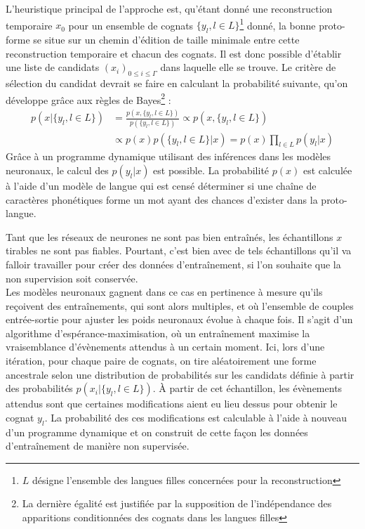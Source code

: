 \documentclass[12pt, french, twoside]{report}
\begin{document}
L'heuristique principal de l'approche est, qu'étant donné une reconstruction temporaire $x_0$ pour un ensemble de cognats $\{y_l, l\in L \}$\footnote{$L$ désigne l'ensemble des langues filles concernées pour la reconstruction} donné, la bonne proto-forme se situe sur un chemin d'édition de taille minimale entre cette reconstruction temporaire et chacun des cognats. Il est donc possible d'établir une liste de candidats $(x_i)_{0\leq{}i\leq{}\Gamma}$ dans laquelle elle se trouve. Le critère de sélection du candidat devrait se faire en calculant la probabilité suivante, qu'on développe grâce aux règles de Bayes\footnote{La dernière égalité est justifiée par la supposition de l'indépendance des apparitions conditionnées des cognats dans les langues filles} :
\begin{equation} \label{probaSampling}
    \begin{split}
        p(x|\{y_l, l \in L\}) & = \frac{p(x, \{y_l, l \in L\})}{p(\{y_l, l \in L\})} \propto p(x, \{y_l, l \in L\})\\
        & \propto p(x)p(\{y_l, l \in L\}|x) = p(x)\prod_{l\in L} p(y_l|x)
    \end{split}
\end{equation}
Grâce à un programme dynamique utilisant des inférences dans les modèles neuronaux, le calcul des $p(y_l|x)$ est possible. La probabilité $p(x)$ est calculée à l'aide d'un modèle de langue qui est censé déterminer si une chaîne de caractères phonétiques forme un mot ayant des chances d'exister dans la proto-langue.\citep[Section 5]{he2022neural}

Tant que les réseaux de neurones ne sont pas bien entraînés, les échantillons $x$ tirables ne sont pas fiables. Pourtant, c'est bien avec de tels échantillons qu'il va falloir travailler pour créer des données d'entraînement, si l'on souhaite que la non supervision soit conservée.\\
Les modèles neuronaux gagnent dans ce cas en pertinence à mesure qu'ils reçoivent des entraînements, qui sont alors multiples, et où l'ensemble de couples entrée-sortie pour ajuster les poids neuronaux évolue à chaque fois. Il s'agit d'un algorithme d'espérance-maximisation\citep{EM}, où un entraînement maximise la vraisemblance d'évènements attendus à un certain moment. Ici, lors d'une itération, pour chaque paire de cognats, on tire aléatoirement une forme ancestrale selon une distribution de probabilités sur les candidats définie à partir des probabilités $p(x_i|\{y_l, l \in L\})$. À partir de cet échantillon, les évènements attendus sont que certaines modifications aient eu lieu dessus pour obtenir le cognat $y_l$. La probabilité des ces modifications est calculable à l'aide à nouveau d'un programme dynamique et on construit de cette façon les données d'entraînement de manière non supervisée.\citep[Section 6]{he2022neural}
\end{document}
